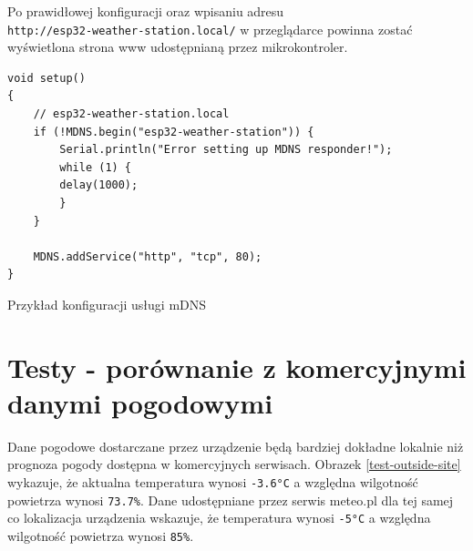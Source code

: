 \documentclass[12pt,a4paper]{article}
\begin{document}
Po prawidłowej konfiguracji oraz wpisaniu adresu \\\texttt{http://esp32-weather-station.local/} w przeglądarce powinna zostać wyświetlona strona www udostępnianą przez mikrokontroler.

\begin{code}[H]
\begin{verbatim}
void setup()
{
    // esp32-weather-station.local
    if (!MDNS.begin("esp32-weather-station")) {
        Serial.println("Error setting up MDNS responder!");
        while (1) {
        delay(1000);
        }
    }

    MDNS.addService("http", "tcp", 80);
}
\end{verbatim}
\caption{Przykład konfiguracji usługi mDNS}
\end{code}

\section[Testy - porównanie z komercyjnymi danymi pogodowymi]{Testy - porównanie z komercyjnymi\\
 danymi pogodowymi}


Dane pogodowe dostarczane przez urządzenie będą bardziej dokładne lokalnie niż prognoza pogody dostępna w komercyjnych serwisach. Obrazek \ref{test-outside-site} wykazuje, że aktualna temperatura wynosi 
\texttt{-3.6°C} a względna wilgotność powietrza wynosi \texttt{73.7\%}. 
Dane udostępniane przez serwis meteo.pl \cite{meteopl-nysa} dla tej samej co lokalizacja urządzenia
wskazuje, że temperatura wynosi 
\texttt{-5°C} a względna wilgotność powietrza wynosi \texttt{85\%}.
\end{document}
